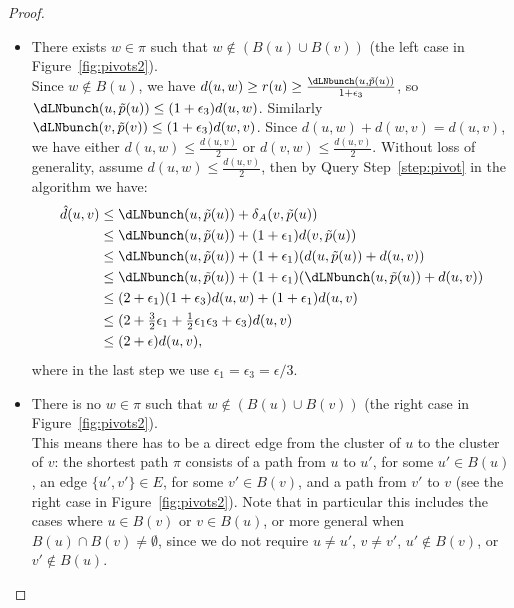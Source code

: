 \begin{proof}
    \begin{itemize}
        \item[Case 1:] There exists $w\in \pi$ such that $w\notin (B(u)\cup B(v))$ (the left case in Figure~\ref{fig:pivots2}).\\
        Since $w\notin B(u)$, we have $d(u,w)\geq   r(u) \geq \tfrac{\dLNbunch(u,\tilde p(u))}{1+\epsilon_3}$, so $\dLNbunch(u,\tilde p(u))\leq (1+\epsilon_3)d(u,w)$. 
        Similarly $\dLNbunch(v,\tilde p(v)) \leq (1+\epsilon_3)d(w,v)$. Since $d(u,w)+d(w,v)=d(u,v)$, we have either
        $d(u,w)\leq \tfrac{d(u,v)}{2}$ or $d(v,w)\leq \tfrac{d(u,v)}{2}$. 
        Without loss of generality, assume $d(u,w) \leq \tfrac{d(u,v)}{2}$, then by Query Step~\ref{step:pivot} in the algorithm we have:
        \begin{align*} 
        \hat{d}(u,v) &\leq \dLNbunch(u,\tilde p(u))+\delta_A(v,\tilde p(u)) \\
        &\leq \dLNbunch(u,\tilde p(u)) +(1+\epsilon_1)d(v,\tilde p(u))\\
        &\leq \dLNbunch(u,\tilde p(u))+(1+\epsilon_1)(d(u,\tilde p(u))+d(u,v))\\
        &\leq \dLNbunch(u,\tilde p(u))+(1+\epsilon_1)(\dLNbunch(u,\tilde p(u))+d(u,v))\\
        &\leq  (2+\epsilon_1)(1+\epsilon_3)d(u,w)+(1+\epsilon_1)d(u,v)\\
        &\leq (2+\tfrac{3}{2}\epsilon_1+\tfrac{1}{2}\epsilon_1\epsilon_3+\epsilon_3)d(u,v)\\
        &\leq (2+\epsilon)d(u,v),
        \end{align*}
        where in the last step we use $\epsilon_1=\epsilon_3=\epsilon/3$.
        \item[Case 2:] 
        There is no $w\in \pi$ such that $w\notin (B(u)\cup B(v))$ (the right case in Figure~\ref{fig:pivots2}).
        \\ 
        This means there has to be a direct edge from the cluster of $u$ to the cluster of $v$: the shortest path $\pi$ consists of a path from $u$ to $u'$, for some $u'\in B(u)$, an edge $\{u',v'\}\in E$, for some $v'\in B(v)$, and a path from $v'$ to $v$ (see the right case in Figure~\ref{fig:pivots2}). Note that in particular this includes the cases where $u\in B(v)$ or $v\in B(u)$, or more general when $B(u)\cap B(v)\neq \emptyset$, since we do not require $u\neq u'$, $v\neq v'$, $u'\notin B(v)$, or $v'\notin B(u)$.\\

\end{itemize}
\end{proof}
